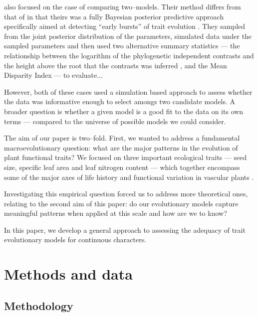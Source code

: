 \documentclass[12pt]{article}
\begin{document}
\citet{SlaterPennell} also focused on the case of comparing two--models. Their method differs from that of \citet{Boettiger2012} in that theirs was a fully Bayesian posterior predictive approach specifically aimed at detecting ``early bursts'' of trait evolution \citep[\textit{sensu}][]{Simpson1944, Simpson1953, Harmon2010}. They sampled from the joint posterior distribution of the parameters, simulated data under the sampled parameters and then used two alternative summary statistics --- the relationship between the logarithm of the phylogenetic independent contrasts and the height above the root that the contrasts was inferred \citep[a.k.a. the ``node height test'';][]{FreckletonHarvey2006}, and the Mean Disparity Index \citep[MDI;][]{Harmon2003, Slater2010} --- to evaluate...

However, both of these cases used a simulation based approach to assess whether the data was informative enough to select amongs two candidate models. A broader question is whether a given model is a good fit to the data on its own terms --- compared to the universe of possible models we could consider.

The aim of our paper is two--fold. First, we wanted to address a fundamental macroevolutionary question: what are the major patterns in the evolution of plant functional traits? We focused on three important ecological traits --- seed size, specific leaf area and leaf nitrogen content --- which together encompass some of the major axes of life history and functional variation in vascular plants \citep{Cornwell2013}. \citep{Wright2004}

Investigating this empirical question forced us to address more theoretical ones, relating to the second aim of this paper: do our evolutionary models capture meaningful patterns when applied at this scale and how are we to know?

In this paper, we develop a general approach to assessing the adequacy of trait evolutionary models for continuous characters.

\section{Methods and data}

\subsection{Methodology}
\end{document}
